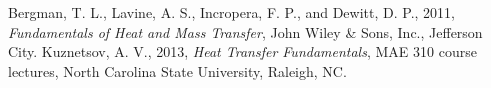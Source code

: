 \documentclass{article}
\begin{document}
\begin{thebibliography}{99}
 Bergman, T. L., Lavine, A. S., Incropera, F. P., and Dewitt, D. P., 2011,
  \emph{Fundamentals of Heat and Mass Transfer}, John Wiley \& Sons, Inc., Jefferson City.
 Kuznetsov, A. V., 2013, \emph{Heat Transfer Fundamentals}, MAE 310 course lectures,
  North Carolina State University, Raleigh, NC.
\end{thebibliography}
\end{document}
